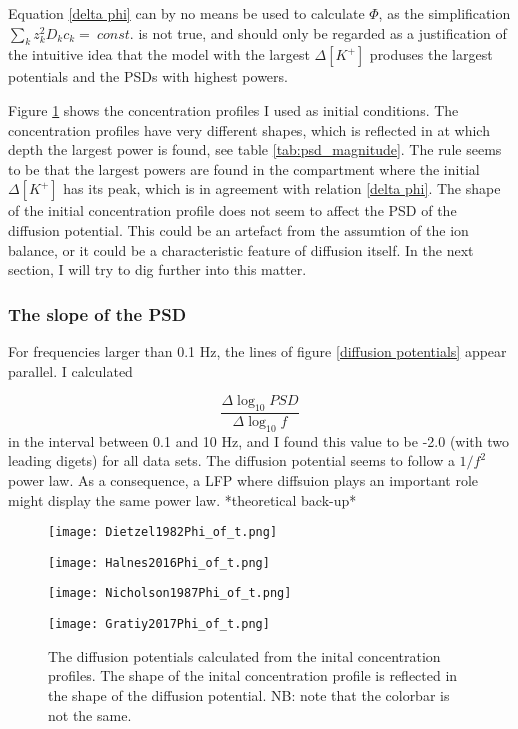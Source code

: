 \documentclass{article}
\begin{document}
Equation \ref{delta phi} can by no means be used to calculate $\Phi$, as the simplification $\sum_k z_k^2 D_k c_k =\ const.$ is not true, and should only be regarded as a justification of the intuitive idea that the model with the largest $\Delta [K^+]$ produses the largest potentials and the PSDs with highest powers. 


Figure \ref{fig:contours} shows the concentration profiles I used as initial conditions. The concentration profiles have very different shapes, which is reflected in at which depth the largest power is found, see table \ref{tab:psd_magnitude}. The rule seems to be that the largest powers are found in the compartment where the initial $\Delta [K^+]$ has its peak, which is in agreement with relation \ref{delta phi}. The shape of the initial concentration profile does not seem to affect the PSD of the diffusion potential. This could be an artefact from the assumtion of the ion balance, or it could be a characteristic feature of diffusion itself. In the next section, I will try to dig further into this matter. 



\subsubsection{The slope of the PSD}
For frequencies larger than 0.1 Hz, the lines of figure \ref{diffusion potentials} appear  parallel. I calculated 

$$\frac{\Delta\log_{10}PSD}{\Delta \log_{10}f}$$
in the interval between 0.1 and 10 Hz, and I found this value to be -2.0 (with two leading digets) for all data sets. The diffusion potential seems to follow a $1/f^2$ power law. As a consequence, a LFP where diffsuion plays an important role might display the same power law.  *theoretical back-up*




\begin{figure}[!tbp]
  \centering
  \begin{minipage}[b]{0.45\textwidth}
    \texttt{[image: Dietzel1982Phi\_of\_t.png]}
  \end{minipage}
  \hfill
  \begin{minipage}[b]{0.45\textwidth}
    \texttt{[image: Halnes2016Phi\_of\_t.png]}
  \end{minipage}
    \begin{minipage}[b]{0.45\textwidth}
    \texttt{[image: Nicholson1987Phi\_of\_t.png]}
  \end{minipage}
  \hfill
  \begin{minipage}[b]{0.45\textwidth}
    \texttt{[image: Gratiy2017Phi\_of\_t.png]}
  \end{minipage}
  \caption{The diffusion potentials calculated from the inital concentration profiles. The shape of the inital concentration profile is reflected in the shape of the diffusion potential. NB: note that the colorbar is not the same.}
  \label{fig:contours}
\end{figure} 
\end{document}
